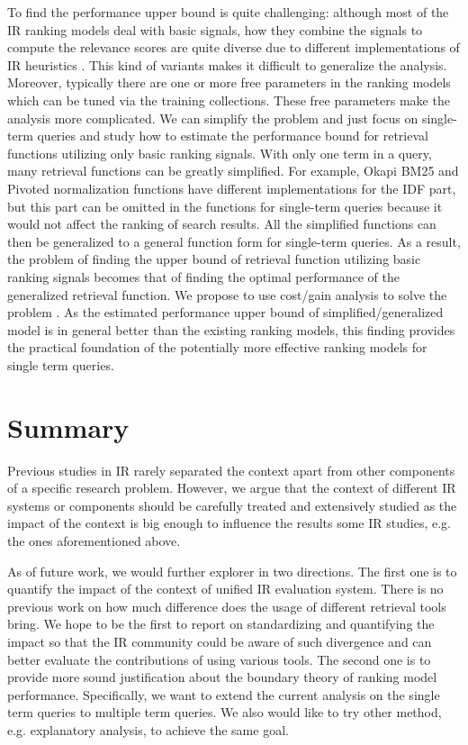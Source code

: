 To find the performance upper bound is quite challenging: although most of 
the IR ranking models deal with basic signals, how they combine the signals 
to compute the relevance scores are quite diverse due to different 
implementations of IR heuristics \cite{Fang:2004:FSI:1008992.1009004}. 
This kind of variants makes it difficult to generalize the analysis. 
Moreover, typically there are one or more free parameters in the ranking 
models which can be tuned via the training collections. 
These free parameters make the analysis more complicated.
We can simplify the problem and just focus on single-term queries 
and study how to estimate the performance bound for retrieval functions 
utilizing only basic ranking signals. 
With only one term in a query, many retrieval functions can be greatly 
simplified. For example, Okapi BM25 and Pivoted normalization functions have 
different implementations for the IDF part, but this part can be omitted in the 
functions for single-term queries because it would not affect the ranking of 
search results. All the simplified functions can then be generalized to a 
general function form for single-term queries. As a result, the problem of 
finding the upper bound of retrieval function utilizing basic ranking signals 
becomes that of finding the optimal performance of the generalized retrieval 
function. We propose to use cost/gain analysis to solve the problem 
\cite{export:132652,export:68133,export:81144}. 
As the estimated performance upper bound of simplified/generalized model 
is in general better than the existing ranking models, this finding 
provides the practical foundation of the potentially more effective 
ranking models for single term queries.

\section{Summary}

Previous studies in IR rarely separated the context apart from other 
components of a specific research problem. However, we argue that the 
context of different IR systems or components should be carefully treated 
and extensively studied as the impact of the context is big enough to 
influence the results some IR studies, e.g. the ones aforementioned above.

As of future work, we would further explorer in two directions. 
The first one is to quantify the impact of the context of unified 
IR evaluation system. There is no previous work on how much difference does 
the usage of different retrieval tools bring.
We hope to be the first to report on standardizing and quantifying the 
impact so that the IR community could be aware of such divergence and can 
better evaluate the contributions of using various tools. 
The second one is to provide more sound justification about the boundary 
theory of ranking model performance. Specifically, we want to extend the 
current analysis on the single term queries to multiple term queries. 
We also would like to try other method, e.g. explanatory analysis, 
to achieve the same goal.

